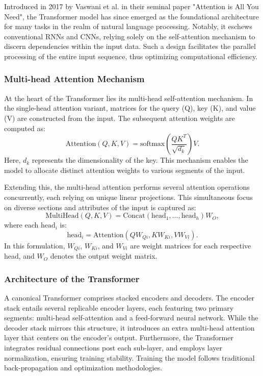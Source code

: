 \documentclass[10pt,twocolumn,letterpaper]{article}
\begin{document}
Introduced in 2017 by Vaswani et al. in their seminal paper "Attention is All You Need", the Transformer model has since emerged as the foundational architecture for many tasks in the realm of natural language processing. Notably, it eschews conventional RNNs and CNNs, relying solely on the self-attention mechanism to discern dependencies within the input data. Such a design facilitates the parallel processing of the entire input sequence, thus optimizing computational efficiency.

\subsubsection{Multi-head Attention Mechanism}

At the heart of the Transformer lies its multi-head self-attention mechanism. In the single-head attention variant, matrices for the query (Q), key (K), and value (V) are constructed from the input. The subsequent attention weights are computed as:
\[ \text{Attention}(Q, K, V) = \text{softmax}\left(\frac{QK^T}{\sqrt{d_k}}\right) V .\]
Here, \(d_k\) represents the dimensionality of the key. This mechanism enables the model to allocate distinct attention weights to various segments of the input.

Extending this, the multi-head attention performs several attention operations concurrently, each relying on unique linear projections. This simultaneous focus on diverse sections and attributes of the input is captured as:
\[ \text{MultiHead}(Q, K, V) = \text{Concat}(\text{head}_1, \dots, \text{head}_h)W_O ,\]
where each \(\text{head}_i\) is:
\[ \text{head}_i = \text{Attention}(QW_{Qi}, KW_{Ki}, VW_{Vi}) .\]
In this formulation, \(W_{Qi}\), \(W_{Ki}\), and \(W_{Vi}\) are weight matrices for each respective head, and \(W_O\) denotes the output weight matrix.

\subsubsection{Architecture of the Transformer}

A canonical Transformer comprises stacked encoders and decoders. The encoder stack entails several replicable encoder layers, each featuring two primary segments: multi-head self-attention and a feed-forward neural network. While the decoder stack mirrors this structure, it introduces an extra multi-head attention layer that centers on the encoder's output. Furthermore, the Transformer integrates residual connections post each sub-layer, and employs layer normalization, ensuring training stability. Training the model follows traditional back-propagation and optimization methodologies.
\end{document}
